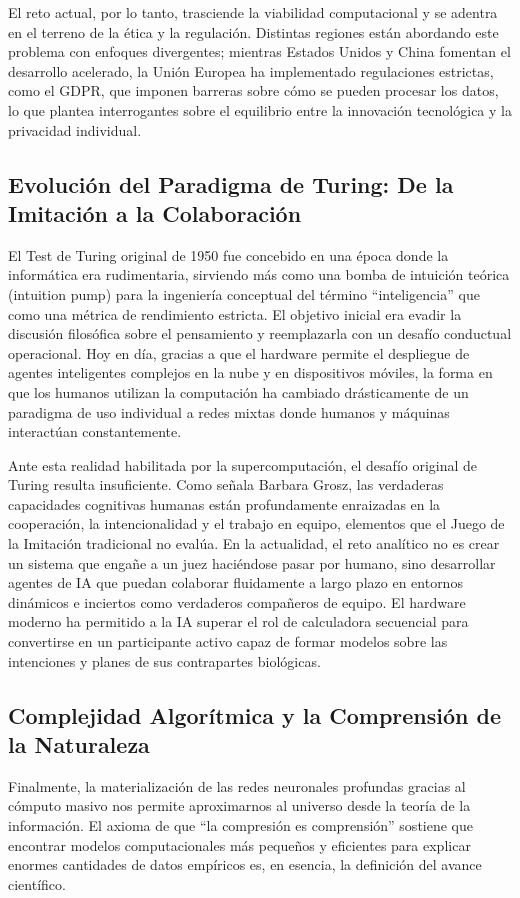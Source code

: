 \documentclass[12pt,a4paper]{article}
\begin{document}
El reto actual, por lo tanto, trasciende la viabilidad computacional y se adentra en el terreno de la ética y la regulación. Distintas regiones están abordando este problema con enfoques divergentes; mientras Estados Unidos y China fomentan el desarrollo acelerado, la Unión Europea ha implementado regulaciones estrictas, como el GDPR, que imponen barreras sobre cómo se pueden procesar los datos, lo que plantea interrogantes sobre el equilibrio entre la innovación tecnológica y la privacidad individual\cite{haenlein2019}.

\subsection{Evolución del Paradigma de Turing: De la Imitación a la Colaboración}
El Test de Turing original de 1950 fue concebido en una época donde la informática era rudimentaria, sirviendo más como una bomba de intuición teórica (intuition pump) para la ingeniería conceptual del término ``inteligencia'' que como una métrica de rendimiento estricta\cite{milkowski2022}. El objetivo inicial era evadir la discusión filosófica sobre el pensamiento y reemplazarla con un desafío conductual operacional\cite{grosz2012}. Hoy en día, gracias a que el hardware permite el despliegue de agentes inteligentes complejos en la nube y en dispositivos móviles, la forma en que los humanos utilizan la computación ha cambiado drásticamente de un paradigma de uso individual a redes mixtas donde humanos y máquinas interactúan constantemente\cite{grosz2012}.

Ante esta realidad habilitada por la supercomputación, el desafío original de Turing resulta insuficiente. Como señala Barbara Grosz, las verdaderas capacidades cognitivas humanas están profundamente enraizadas en la cooperación, la intencionalidad y el trabajo en equipo, elementos que el Juego de la Imitación tradicional no evalúa\cite{grosz2012}. En la actualidad, el reto analítico no es crear un sistema que engañe a un juez haciéndose pasar por humano, sino desarrollar agentes de IA que puedan colaborar fluidamente a largo plazo en entornos dinámicos e inciertos como verdaderos compañeros de equipo\cite{grosz2012}. El hardware moderno ha permitido a la IA superar el rol de calculadora secuencial para convertirse en un participante activo capaz de formar modelos sobre las intenciones y planes de sus contrapartes biológicas\cite{grosz2012}.

\subsection{Complejidad Algorítmica y la Comprensión de la Naturaleza}
Finalmente, la materialización de las redes neuronales profundas gracias al cómputo masivo nos permite aproximarnos al universo desde la teoría de la información. El axioma de que ``la compresión es comprensión'' sostiene que encontrar modelos computacionales más pequeños y eficientes para explicar enormes cantidades de datos empíricos es, en esencia, la definición del avance científico\cite{zenil2021}. 
\end{document}
